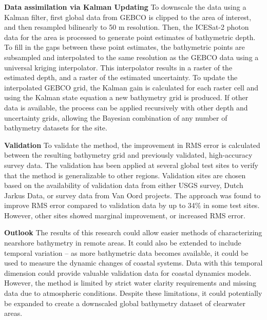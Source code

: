 \noindent\textbf{Data assimilation via Kalman Updating} To downscale the data using a Kalman filter, first global data from GEBCO is clipped to the area of interest, and then resampled bilinearly to 50 m resolution. Then, the ICESat-2 photon data for the area is processed to generate point estimates of bathymetric depth. To fill in the gaps between these point estimates, the bathymetric points are subsampled and interpolated to the same resolution as the GEBCO data using a universal kriging interpolator. This interpolator results in a raster of the estimated depth, and a raster of the estimated uncertainty. To update the interpolated GEBCO grid, the Kalman gain is calculated for each raster cell and using the Kalman state equation a new bathymetry grid is produced. If other data is available, the process can be applied recursively with other depth and uncertainty grids, allowing the Bayesian combination of any number of bathymetry datasets for the site.


\noindent \textbf{Validation} To validate the method, the improvement in RMS error is calculated between the resulting bathymetry grid and previously validated, high-accuracy survey data. The validation has been applied at several global test sites to verify that the method is generalizable to other regions. Validation sites are chosen based on the availability of validation data from either USGS survey, Dutch Jarkus Data, or survey data from Van Oord projects. The approach was found to improve RMS error compared to validation data by up to 34\% in some test sites. However, other sites showed marginal improvement, or increased RMS error.   


\noindent\textbf{Outlook} The results of this research could allow easier methods of characterizing nearshore bathymetry in remote areas. It could also be extended to include temporal variation – as more bathymetric data becomes available, it could be used to measure the dynamic changes of coastal systems. Data with this temporal dimension could provide valuable validation data for coastal dynamics models. However, the method is limited by strict water clarity requirements and missing data due to atmospheric conditions. Despite these limitations, it could potentially be expanded to create a downscaled global bathymetry dataset of clearwater areas.